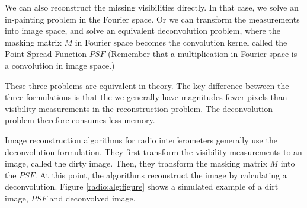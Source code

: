 We can also reconstruct the missing visibilities directly. In that case, we solve an in-painting problem in the Fourier space. Or we can transform the measurements into image space, and solve an equivalent deconvolution problem, where the masking matrix $M$ in Fourier space becomes the convolution kernel called the Point Spread Function $PSF$ (Remember that a multiplication in Fourier space is a convolution in image space.)

These three problems are equivalent in theory. The key difference between the three formulations is that the we generally have magnitudes fewer pixels than visibility measurements in the reconstruction problem. The deconvolution problem therefore consumes less memory.

Image reconstruction algorithms for radio interferometers generally use the deconvolution formulation. They first transform the visibility measurements to an image, called the dirty image. Then, they transform the masking matrix $M$ into the $PSF$. At this point, the algorithms reconstruct the image by calculating a deconvolution. Figure \ref{radio:alg:figure} shows a simulated example of a dirt image, $PSF$ and deconvolved image.

